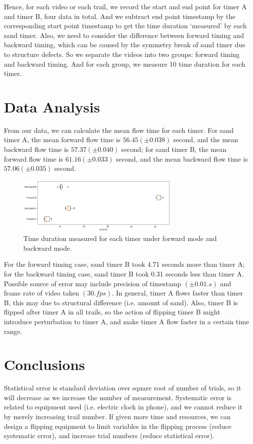 \documentclass[twocolumn,preprintnumbers,amsmath,amssymb,longbibliography]{revtex4-1}
\begin{document}
Hence, for each video or each trail, we record the start and end point for timer A and timer B, four data in total. And we subtract end point timestamp by the corresponding start point timestamp to get the time duration `measured' by each sand timer. Also, we need to consider the difference between forward timing and backward timing, which can be caused by the symmetry break of sand timer due to structure defects. So we separate the videos into two groups: forward timing and backward timing. And for each group, we measure 10 time duration for each timer. 

\section{Data Analysis}
From our data, we can calculate the mean flow time for each timer. For sand timer A, the mean forward flow time is $56.45 (\pm 0.038)$ second, and the mean backward flow time is $57.37 (\pm 0.040)$ second; for sand timer B, the mean forward flow time is $61.16 (\pm 0.033)$ second, and the mean backward flow time is $57.06 (\pm 0.035)$ second.


\begin{figure}[H]
\centering
\includegraphics[width=8cm]{data.png}
\caption{\label{data} Time duration measured for each timer under forward mode and backward mode.} 
\end{figure}
    

For the forward timing case, sand timer B took 4.71 seconds more than timer A; for the backward timing case, sand timer B took 0.31 seconds less than timer A. Possible source of error may include precision of timestamp $(\pm 0.01 \si{.s})$ and frame rate of video taken $(30 \si{.fps})$. In general, timer A flows faster than timer B, this may due to structural difference (i.e. amount of sand). Also, timer B is flipped after timer A in all trails, so the action of flipping timer B might introduce perturbation to timer A, and make timer A flow faster in a certain time range. 

\section{Conclusions}
Statistical error is standard deviation over square root of number of trials, so it will decrease as we increase the number of measurement. Systematic error is related to equipment used (i.e. electric clock in phone), and we cannot reduce it by merely increasing trail number. If given more time and resources, we can design a flipping equipment to limit variables in the flipping process (reduce systematic error), and increase trial numbers (reduce statistical error).
\end{document}
